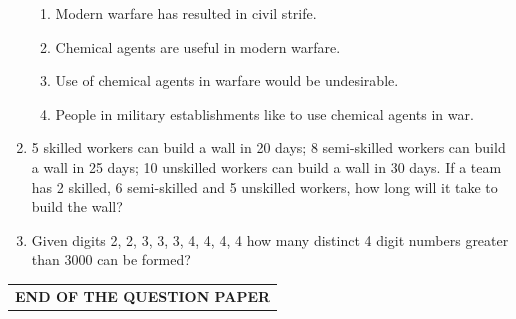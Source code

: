 \documentclass[journal,12pt,onecolumn]{IEEEtran}
\theoremstyle{remark}
\begin{document}
\begin{enumerate}
\begin{enumerate}
	\item Modern warfare has resulted in civil strife.
	\item Chemical agents are useful in modern warfare.
	\item Use of chemical agents in warfare would be undesirable.
	\item People in military establishments like to use chemical agents in war.
\end{enumerate}

\item 5 skilled workers can build a wall in 20 days; 8 semi-skilled workers can build a wall in 25 days; 10 unskilled workers can build a wall in 30 days. If a team has 2 skilled, 6 semi-skilled and 5 unskilled workers, how long will it take to build the wall?\hfill{}

\begin{enumerate}  \end{enumerate}

\item Given digits 2, 2, 3, 3, 3, 4, 4, 4, 4 how many distinct 4 digit numbers greater than 3000 can be formed?\hfill{}

\begin{enumerate}  \end{enumerate}
\end{enumerate}

\hrulefill
\begin{center}
\begin{tabular}{c}
\textbf{END OF THE QUESTION PAPER}
\end{tabular}
\end{center}
\end{document}

